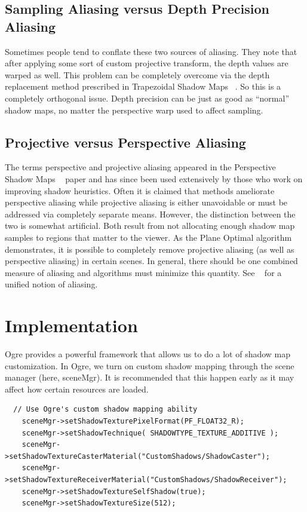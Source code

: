 \documentclass[]{article}  %
\begin{document}
\subsection{Sampling Aliasing versus Depth Precision Aliasing}
Sometimes people tend to conflate these two sources of aliasing.  They note that after applying some sort of custom projective transform, the depth values are warped as well.  This problem can be completely overcome via the depth replacement method prescribed in Trapezoidal Shadow Maps ~\cite{MT04}.  So this is a completely orthogonal issue.  Depth precision can be just as good as ``normal'' shadow maps, no matter the perspective warp used to affect sampling.  

\subsection{Projective versus Perspective Aliasing}
The terms perspective and projective aliasing appeared in the Perspective Shadow Maps ~\cite{SD02} paper and has since been used extensively by those who work on improving shadow heuristics.  Often it is claimed that methods ameliorate perspective aliasing while projective aliasing is either unavoidable or must be addressed via completely separate means.  However, the distinction between the two is somewhat artificial.  Both result from not allocating enough shadow map samples to regions that matter to the viewer.  As the Plane Optimal algorithm demonstrates, it is possible to completely remove projective aliasing (as well as perspective aliasing) in certain scenes.  In general, there should be one combined measure of aliasing and algorithms must minimize this quantity.  See ~\cite{Chong06} for a unified notion of aliasing.  


\section{Implementation}
\label{Implementation}

Ogre provides a powerful framework that allows us to do a lot of shadow map customization.  
In Ogre, we turn on custom shadow mapping through the scene manager (here, sceneMgr).  It is recommended that this happen early as it may affect how certain resources are loaded.  

\begin{verbatim}
  // Use Ogre's custom shadow mapping ability
	sceneMgr->setShadowTexturePixelFormat(PF_FLOAT32_R);
	sceneMgr->setShadowTechnique( SHADOWTYPE_TEXTURE_ADDITIVE );
	sceneMgr->setShadowTextureCasterMaterial("CustomShadows/ShadowCaster");
	sceneMgr->setShadowTextureReceiverMaterial("CustomShadows/ShadowReceiver");
	sceneMgr->setShadowTextureSelfShadow(true);	
	sceneMgr->setShadowTextureSize(512);
\end{verbatim}
\end{document}
